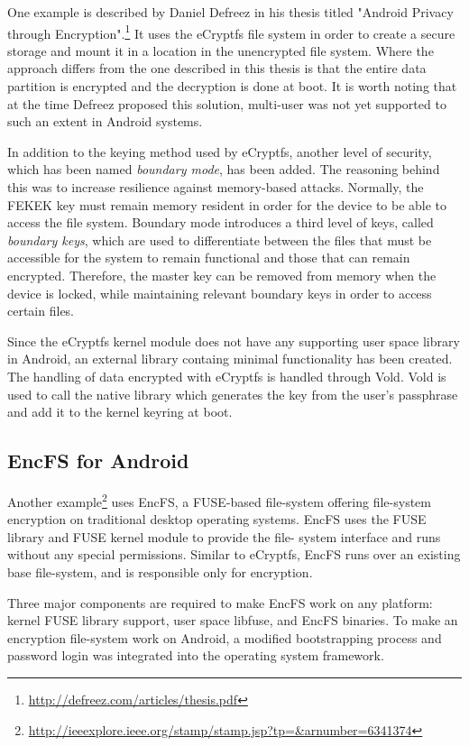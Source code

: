 One example is described by Daniel Defreez in his thesis titled "Android Privacy through Encryption".\footnote{\url{http://defreez.com/articles/thesis.pdf}}
It uses the eCryptfs file system in order to create a secure storage and mount it in a location in the unencrypted file system. Where the approach differs from the one described in this thesis is that the entire data partition is encrypted and the decryption is done at boot. It is worth noting that at the time Defreez proposed this solution, multi-user was not yet supported to such an extent in Android systems.

In addition to the keying method used by eCryptfs, another level of security, which has been named \textit{boundary mode}, has been added. The reasoning behind this was to increase resilience against memory-based attacks. Normally, the FEKEK key must remain memory resident in order for the device to be able to access the file system. Boundary mode introduces a third level of keys, called \textit{boundary keys}, which are used to differentiate between the files that must be accessible for the system to remain functional and those that can remain encrypted. Therefore, the master key can be removed from memory when the device is locked, while maintaining relevant boundary keys in order to access certain files.

Since the eCryptfs kernel module does not have any supporting user space library in Android, an external library containg minimal functionality has been created. The handling of data encrypted with eCryptfs is handled through Vold. Vold is used to call the native library which generates the key from the user's passphrase and add it to the kernel keyring at boot.

\subsection{EncFS for Android}
\label{sub-sec:encfs}

Another example\footnote{\url{http://ieeexplore.ieee.org/stamp/stamp.jsp?tp=&arnumber=6341374}} uses EncFS, a FUSE-based file-system offering file-system encryption on traditional desktop operating systems. EncFS uses the FUSE library and FUSE kernel module to provide the file- system interface and runs without any special permissions. Similar to eCryptfs, EncFS runs over an existing base file-system, and is responsible only for encryption.

Three major components are required to make EncFS work on any platform: kernel FUSE library support, user space libfuse, and EncFS binaries. To make an encryption file-system work on Android, a modified bootstrapping process and password login was integrated into the operating system framework.

